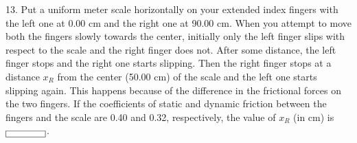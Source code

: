  13. Put a uniform meter scale horizontally on your extended index fingers with the left one at 0.00 cm and the right one at 90.00 cm. When you attempt to move both the fingers slowly towards the center, initially only the left finger slips with respect to the scale and the right finger does not. After some distance, the left finger stops and the right one starts slipping. Then the right finger stops at a distance \(x_R\) from the center (50.00 cm) of the scale and the left one starts slipping again. This happens because of the difference in the frictional forces on the two fingers. If the coefficients of static and dynamic friction between the fingers and the scale are 0.40 and 0.32, respectively, the value of \(x_R\) (in cm) is \(\boxed{~\hspace{1.0cm}~}\).

\begin{center}
\end{center}